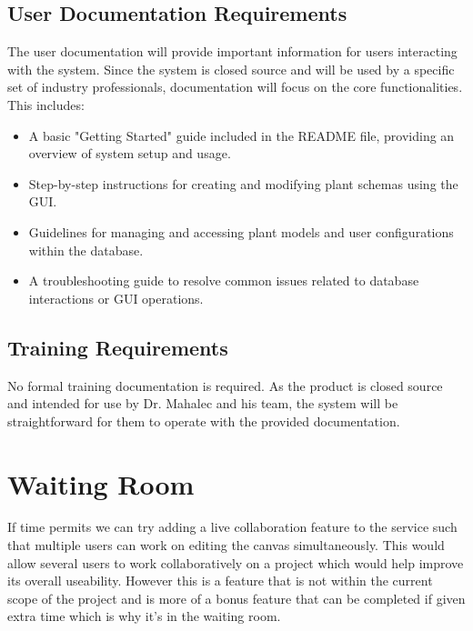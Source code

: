 \documentclass[12pt]{article}
\begin{document}
\subsection{User Documentation Requirements}
The user documentation will provide important information for users interacting with the system. Since the system is closed source and will be used by a specific set of industry professionals, documentation will focus on the core functionalities. This includes:
\begin{itemize}
  \item A basic "Getting Started" guide included in the README file, providing an overview of system setup and usage.
  \item Step-by-step instructions for creating and modifying plant schemas using the GUI.
  \item Guidelines for managing and accessing plant models and user configurations within the database.
  \item A troubleshooting guide to resolve common issues related to database interactions or GUI operations.
\end{itemize}
\subsection{Training Requirements}
No formal training documentation is required. As the product is closed source and intended for use by Dr. Mahalec and his team, the system will be straightforward for them to operate with the provided documentation.

\section{Waiting Room}
If time permits we can try adding a live collaboration feature to the service such that multiple users can work on editing the canvas simultaneously. This would allow several users to work collaboratively on a project which would help improve its overall useability. However this is a feature that is not within the current scope of the project and is more of a bonus feature that can be completed if given extra time which is why it's in the waiting room. 
\end{document}
